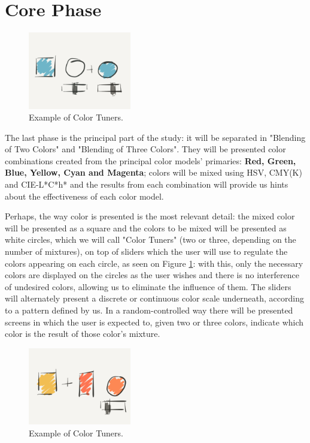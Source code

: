 \documentclass{report}
\begin{document}
\section{Core Phase}
%
\begin{figure}
	\centering
    \vspace{-\baselineskip}
    \includegraphics[width=0.4\textwidth]{Prop1.PNG}
    \caption[Color Tuners with Blue Color]{Example of Color Tuners.}
    \label{fig:tuners1}
\end{figure}
%
The last phase is the principal part of the study: it will be separated in "Blending of Two Colors" and "Blending of Three Colors". They will be presented
color combinations created from the principal color models' primaries: \textbf{Red, Green, Blue, Yellow, Cyan and Magenta}; colors will be mixed
using HSV, CMY(K) and CIE-L*C*h* and the results from each combination will provide us hints about the effectiveness of each color model. \par 
Perhaps, the way color is presented is the most relevant detail: the mixed color will be presented as a square and the colors to be mixed will be presented as white
circles, which we will call "Color Tuners" (two or three, depending on the number of mixtures), on top of sliders which the user will use to regulate
the colors appearing on each circle, as seen on Figure \ref{fig:tuners1}: with this, only the necessary colors are displayed on the circles as the user wishes and there is no interference
of undesired colors, allowing us to eliminate the influence of them. The sliders will alternately present a discrete or continuous color scale underneath, according to a pattern defined by us. In a random-controlled way there will be presented
screens in which the user is expected to, given two or three colors, indicate
which color is the result of those color's mixture. \par
%
\begin{figure}
	\centering
    \vspace{-\baselineskip}
    \includegraphics[width=0.4\textwidth]{Prop2.png}
    \caption[Color Tuners Expectation]{Example of Color Tuners.}
    \label{fig:tuners2}
\end{figure}
\end{document}
